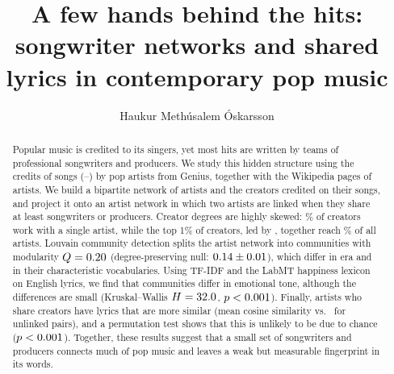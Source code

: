 \documentclass[9pt,twocolumn,twoside]{pnas-new}
\begin{document}
\title{A few hands behind the hits: songwriter networks and shared lyrics in contemporary pop music}

\author[a,1]{Haukur Meth\'usalem \'Oskarsson}






\begin{abstract}
\DataStatus{} Popular music is credited to its singers, yet most hits are written by teams of professional songwriters and producers. We study this hidden structure using the credits of \NumSongs{} songs (\YearMin--\YearMax) by \NumArtists{} pop artists from Genius, together with the Wikipedia pages of \WikiArtists{} artists. We build a bipartite network of artists and the \NumCreators{} creators credited on their songs, and project it onto an artist network in which two artists are linked when they share at least \MinEdgeWeight{} songwriters or producers. Creator degrees are highly skewed: \PctOneArtistCreators\% of creators work with a single artist, while the top 1\% of creators, led by \TopCreator, together reach \PctReachedTopOne\% of all artists. Louvain community detection splits the artist network into communities with modularity $Q=0.20$ (degree-preserving null: $0.14 \pm 0.01$), which differ in era and in their characteristic vocabularies. Using TF-IDF and the LabMT happiness lexicon on \NumSongsLyrics{} English lyrics, we find that communities differ in emotional tone, although the differences are small (Kruskal--Wallis $H=32.0$, $p<0.001$). Finally, artists who share creators have lyrics that are more similar (mean cosine similarity \SimLinked{} vs.\ \SimUnlinked{} for unlinked pairs), and a permutation test shows that this is unlikely to be due to chance ($p<0.001$). Together, these results suggest that a small set of songwriters and producers connects much of pop music and leaves a weak but measurable fingerprint in its words.
\end{abstract}
\end{document}
